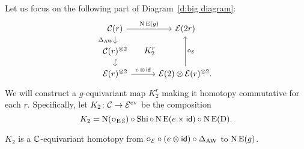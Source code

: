 Let us focus on the following part of Diagram~\eqref{d:big diagram}:
\[
	\begin{tikzcd}[row sep=small]
		\cC(r)
		\arrow[r,"\chains\EE(g)"]
		\arrow[d,"\Delta_{\AW}"']
		\arrow[ddr,phantom,"K_2^r",shift left=0pt]
		&[5pt] \BE(2r) \\
		\cC(r)^{\ot 2}
		\arrow[d,hook] & \\
		\BE(r)^{\ot 2}
		\arrow[r,"e\, \ot\, \id"]
		& \BE(2) \ot \BE(r)^{\ot 2}.
		\arrow[uu,"\bcomp_\BE"']
	\end{tikzcd}
\]
We will construct a $g$-equivariant map $K_2^r$ making it homotopy commutative for each $r$.
Specifically, let $K_2 \colon \mathcal{C} \to \mathcal{E}^{\mathrm{ev}}$ be the composition
\[
K_2 = \operatorname{N}(\bm{\mathbin{\circ}}_{\operatorname{E}\mathbb{S}}) \mathbin{\circ} \operatorname{Shi} \mathbin{\circ} \operatorname{N}\operatorname{E}(e \times \mathsf{id}) \mathbin{\circ} \operatorname{N}\operatorname{E}(\mathrm{D}).
\]

\begin{lemma}\label{l:K2}
	$K_2$ is a $\mathbb{C}$-equivariant homotopy from $\bm{\mathbin{\circ}}_{\mathcal{E}} \mathbin{\circ} (e \otimes \mathsf{id}) \mathbin{\circ} \Delta_{\operatorname{AW}}$ to $\operatorname{N}\operatorname{E}(g)$.
\end{lemma}

